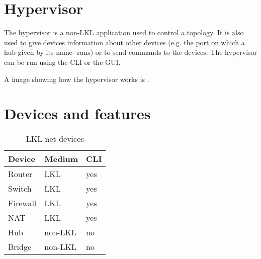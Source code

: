 \section{Hypervisor}
\label{sub-sec:hypervisor}
The hypervisor is a non-LKL application used to control a topology. It is also used to give devices information about other devices (e.g. the port on which a hub-given by its name- runs) or to send commands to the devices. The hypervisor can be run using the CLI or the GUI.

A image showing how the hypervisor works is . 

\section{Devices and features}
\begin{center}
  \begin{table}[htb]
  \begin{center}
  \begin{tabular}{ | l | l | l |}
    \hline
      Device & Medium & CLI\\ \hline
      Router & LKL & yes \\ \hline
      Switch & LKL & yes\\ \hline
      Firewall & LKL & yes\\ \hline
      NAT & LKL & yes\\ \hline
      Hub & non-LKL & no\\ \hline
      Bridge & non-LKL & no\\ 
    \hline
  \end{tabular}
  \end{center}
  \caption{LKL-net devices}
  \label{table:tdevices}
  \end{table}
\end{center}
